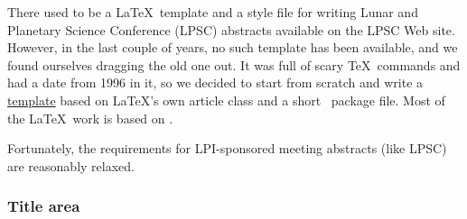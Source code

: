 \documentclass[twoside]{article}
\begin{document}


%

%



There used to be a \LaTeX\ template and a style file for writing
Lunar and Planetary Science Conference (LPSC) abstracts available
on the LPSC Web site.  However, in the last couple of years, no
such template has been available, and we found ourselves dragging
the old one out.  It was full of scary \TeX\ commands and had a
date from 1996 in it, so we decided to start from scratch and write
a \href{http://rossbeyer.net/software/lpsc_template/}{template} based 
on \LaTeX's own article class and a short \LaTeXe\
package file.  Most of the \LaTeX\ work is based on \citet{latexguide}.

Fortunately, the requirements for LPI-sponsored meeting abstracts (like LPSC)
are reasonably relaxed.

\subsubsection*{Title area}
\end{document}
